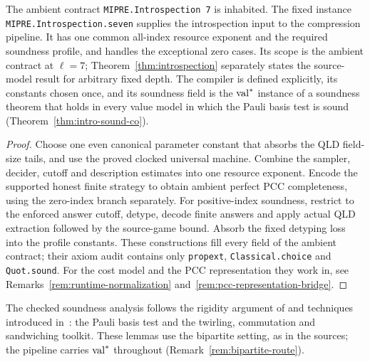 \begin{lemma}
\label{lem:introspection-supply}
\leanok
The ambient contract \texttt{MIPRE.Introspection 7} is inhabited.
The fixed instance \texttt{MIPRE.Introspection.seven} supplies the introspection
input to the compression pipeline. It has one common all-index resource
exponent and the required soundness profile, and handles the exceptional
zero cases. Its scope is the ambient contract at $\ell=7$;
Theorem~\ref{thm:introspection} separately states the source-model result for
arbitrary fixed depth.
The compiler is defined explicitly, its constants chosen once, and its soundness field is the
$\mathrm{val}^*$ instance of a soundness theorem that holds in every value model in which the Pauli
basis test is sound (Theorem~\ref{thm:intro-sound-co}).
\end{lemma}
\begin{proof}
\leanok
Choose one even canonical parameter constant that absorbs the QLD field-size
tails, and use the proved clocked universal machine. Combine the sampler,
decider, cutoff and description estimates into one resource exponent.
Encode the supported honest finite strategy to obtain ambient perfect PCC
completeness, using the zero-index branch separately. For positive-index
soundness, restrict to the enforced answer cutoff, detype, decode finite
answers and apply actual QLD extraction followed by the source-game bound.
Absorb the fixed detyping loss into the profile constants. These constructions
fill every field of the ambient contract; their axiom audit contains only
\texttt{propext}, \texttt{Classical.choice} and \texttt{Quot.sound}. For the cost model
and the PCC representation they work in, see Remarks~\ref{rem:runtime-normalization}
and~\ref{rem:pcc-representation-bridge}.
\end{proof}

The checked soundness analysis follows the rigidity argument of
\cite[Section 8]{JNVWY20} and techniques introduced in~\cite{NW19}: the Pauli
basis test and the twirling, commutation and sandwiching toolkit. These lemmas
use the bipartite setting, as in the sources; the pipeline carries $\mathrm{val}^*$
throughout (Remark~\ref{rem:bipartite-route}).


